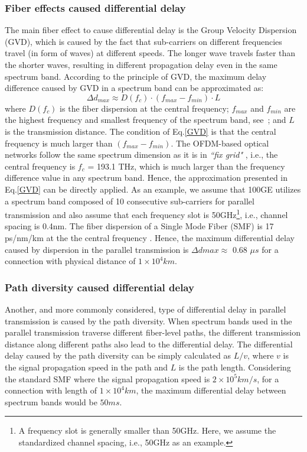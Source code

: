 \documentclass[conference]{IEEEtran}
\begin{document}
\subsubsection{Fiber effects caused differential delay} 
The main fiber effect to cause differential delay is the Group Velocity Dispersion (GVD), which is caused by the fact that sub-carriers on different frequencies travel (in form of waves) at different speeds. The longer wave travels faster than the shorter waves, resulting in different propagation delay even in the same spectrum band.  According to the principle of GVD, the maximum delay difference caused by GVD in a spectrum band can be approximated as: 
\begin{equation} \label{GVD}  
 \Delta  d_{max} \approx  D(f_c) \cdot (f_{max}-f_{min}) \cdot L
\end{equation}
where $D(f_c)$ is the fiber dispersion at the central frequency; $f_{max}$ and $f_{min}$ are the highest frequency and smallest frequency of the spectrum band, see~\cite{Sun:2008}; and $L$ is the transmission distance.
The condition of Eq.\eqref{GVD} is that the central frequency is much larger than $(f_{max}-f_{min})$. The OFDM-based optical networks follow the same spectrum dimension as it is in  \emph{``fix grid"} \cite{Jinno:2009}, i.e., the central frequency is $f_c$ = 193.1 THz, which is much larger than the frequency difference value   in any spectrum band. Hence, the approximation presented in Eq.\eqref{GVD} can be directly applied. As an example,  we assume that 100GE utilizes a spectrum band composed of 10 consecutive sub-carriers for parallel transmission and also assume that each frequency slot is 50GHz\footnote{A frequency slot is generally smaller than 50GHz. Here, we assume the standardized channel spacing, i.e., 50GHz as an example. }, i.e., channel spacing is 
0.4nm. The fiber dispersion of a Single Mode Fiber (SMF) is 17 ps/nm/km at the the central frequency \cite{Sun:2008}. Hence, the maximum differential delay caused by dispersion in the parallel transmission is  $\Delta d{max} \approx$ 0.68 $\mu s$ for a connection with physical distance of $1 \times 10^4 km$. 

\subsubsection{Path diversity caused differential delay} 
Another, and more commonly considered, type of differential delay in parallel transmission is caused by the path diversity. When spectrum bands used in the parallel transmission traverse different fiber-level paths,  the different transmission distance along different paths also lead to the differential delay. The differential delay caused by the path diversity can be simply calculated as $L/v$, where $v$ is the signal propagation speed in the path and $L$ is the path length. Considering the standard SMF where the signal propagation  speed is $2 \times 10^5 km/s$, for a  connection with length of $1 \times 10^4 km$,  the  maximum differential delay between spectrum bands would be $50ms$. 
    
\end{document}
